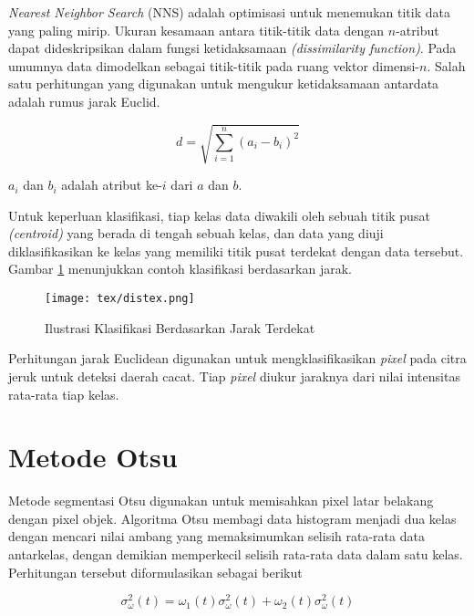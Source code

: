 \documentclass[laporan.tex]{subfiles}
\begin{document}
\emph{Nearest Neighbor Search} (NNS) adalah optimisasi untuk menemukan titik data yang paling mirip. Ukuran kesamaan antara titik-titik data dengan $n$-atribut dapat dideskripsikan dalam fungsi ketidaksamaan \emph{(dissimilarity function)}.\cite{knuth} Pada umumnya data dimodelkan sebagai titik-titik pada ruang vektor dimensi-$n$. Salah satu perhitungan yang digunakan untuk mengukur ketidaksamaan antardata adalah rumus jarak Euclid.

\begin{equation}
	d=\sqrt{\sum_{i=1}^n (a_i - b_i)^2}
\end{equation}

$a_i$ dan $b_i$ adalah atribut ke-$i$ dari $a$ dan $b$.

Untuk keperluan klasifikasi, tiap kelas data diwakili oleh sebuah titik pusat \emph{(centroid)} yang berada di tengah sebuah kelas, dan data yang diuji diklasifikasikan ke kelas yang memiliki titik pusat terdekat dengan data tersebut. Gambar \ref{fig:distex} menunjukkan contoh klasifikasi berdasarkan jarak.

\begin{figure}[h]
\centering
\texttt{[image: tex/distex.png]}
\caption{Ilustrasi Klasifikasi Berdasarkan Jarak Terdekat}
\label{fig:distex}
\end{figure}

Perhitungan jarak Euclidean digunakan untuk mengklasifikasikan \emph{pixel} pada citra jeruk untuk deteksi daerah cacat. Tiap \emph{pixel} diukur jaraknya dari nilai intensitas rata-rata tiap kelas.

\section{Metode Otsu}

Metode segmentasi Otsu digunakan untuk memisahkan pixel latar belakang dengan pixel objek. Algoritma Otsu membagi data histogram menjadi dua kelas dengan mencari nilai ambang yang memaksimumkan selisih rata-rata data antarkelas, dengan demikian memperkecil selisih rata-rata data dalam satu kelas. Perhitungan tersebut diformulasikan sebagai berikut

\begin{equation}
	\sigma_{\omega}^2 (t) = \omega_1 (t) \sigma_{\omega}^2 (t) + \omega_2 (t) \sigma_{\omega}^2 (t)
\end{equation}
\end{document}
